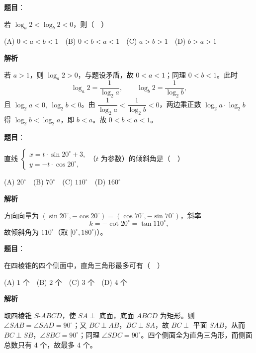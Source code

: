 \begin{answer}

\textbf{题目}：

若 \(\log_a 2<\log_b 2<0\)，则（　）

(A) \(0<a<b<1\)　(B) \(0<b<a<1\)　(C) \(a>b>1\)　(D) \(b>a>1\)

\textbf{解析}

若 \(a>1\)，则 \(\log_a2>0\)，与题设矛盾，故 \(0<a<1\)；同理 \(0<b<1\)。此时
\nopagebreak[4]
\[
\log_a2=\frac{1}{\log_2 a},\qquad \log_b2=\frac{1}{\log_2 b},
\]
且 \(\log_2 a<0,\ \log_2 b<0\)。由 \(\dfrac{1}{\log_2 a}<\dfrac{1}{\log_2 b}<0\)，两边乘正数 \(\log_2 a\cdot\log_2 b\) 得 \(\log_2 b<\log_2 a\)，即 \(b<a\)。故 \(0<b<a<1\)。


\end{answer}
\begin{answer}

\textbf{题目}：

直线 \(\begin{cases}x=t\cdot\sin 20^{\circ}+3,\\ y=-t\cdot\cos 20^{\circ},\end{cases}\)（\(t\) 为参数）的倾斜角是（　）

(A) \(20^{\circ}\)　(B) \(70^{\circ}\)　(C) \(110^{\circ}\)　(D) \(160^{\circ}\)

\textbf{解析}

方向向量为 \((\sin20^\circ,-\cos20^\circ)=(\cos70^\circ,-\sin70^\circ)\)，斜率
\nopagebreak[4]
\[
k=-\cot20^\circ=\tan110^\circ,
\]
故倾斜角为 \(110^\circ\)（取 \([0^\circ,180^\circ)\)）。


\end{answer}
\begin{answer}

\textbf{题目}：

在四棱锥的四个侧面中，直角三角形最多可有（　）

(A) \(1\) 个　(B) \(2\) 个　(C) \(3\) 个　(D) \(4\) 个

\textbf{解析}

取四棱锥 \(S\text{-}ABCD\)，使 \(SA\perp\) 底面，底面 \(ABCD\) 为矩形。则 \(\angle SAB=\angle SAD=90^\circ\)；又 \(BC\perp AB\)，\(BC\perp SA\)，故 \(BC\perp\) 平面 \(SAB\)，从而 \(BC\perp SB\)，\(\angle SBC=90^\circ\)；同理 \(\angle SDC=90^\circ\)。四个侧面全为直角三角形，而侧面总数只有 4 个，故最多 4 个。


\end{answer}
